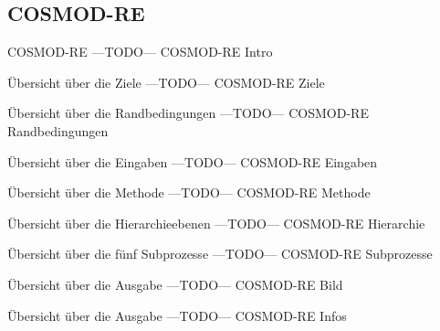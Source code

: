 \subsection{COSMOD-RE}
\begin{frame}{COSMOD-RE}
---TODO--- COSMOD-RE Intro
\end{frame}
\begin{frame}{\"Ubersicht \"uber die Ziele}
---TODO--- COSMOD-RE Ziele
\end{frame}
\begin{frame}{\"Ubersicht \"uber die Randbedingungen}
---TODO--- COSMOD-RE Randbedingungen
\end{frame}
\begin{frame}{\"Ubersicht \"uber die Eingaben}
---TODO--- COSMOD-RE Eingaben
\end{frame}
\begin{frame}{\"Ubersicht \"uber die Methode}
---TODO--- COSMOD-RE Methode
\end{frame}
\begin{frame}{\"Ubersicht \"uber die Hierarchieebenen}
---TODO--- COSMOD-RE Hierarchie
\end{frame}
\begin{frame}{\"Ubersicht \"uber die f\"unf Subprozesse}
---TODO--- COSMOD-RE Subprozesse
\end{frame}
\begin{frame}{\"Ubersicht \"uber die Ausgabe}
---TODO--- COSMOD-RE Bild
\end{frame}
\begin{frame}{\"Ubersicht \"uber die Ausgabe}
---TODO--- COSMOD-RE Infos
\end{frame}
